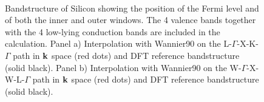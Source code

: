 \begin{enumerate}
	\begin{figure}[h!]
	\centering
	\\
	\centering
	\caption{Bandstructure of Silicon showing the position of the Fermi level and of both the inner and outer windows. The 4 valence bands together with the 4 low-lying conduction bands are included in the calculation. Panel a) Interpolation with Wannier90 on the \mbox{L-$\Gamma$-X-K-$\Gamma$} path in $\bfk$ space (red dots) and DFT reference bandstructure (solid black). Panel b) Interpolation with Wannier90 on the \mbox{W-$\Gamma$-X-W-L-$\Gamma$} path in $\bfk$ space (red dots) and DFT reference bandstructure (solid black).}\label{fig3.2}
	\end{figure}

\end{enumerate}
